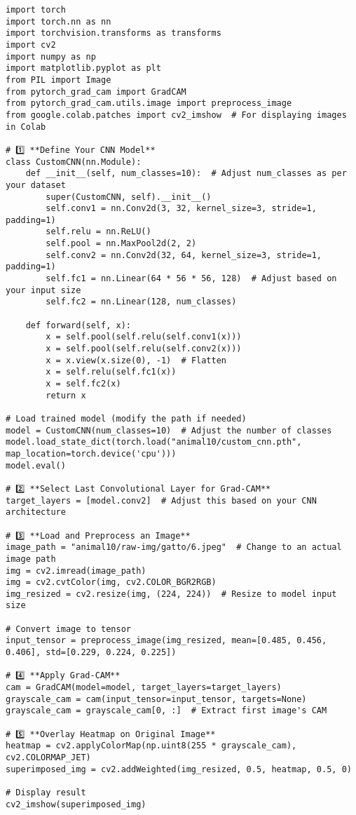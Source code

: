 \begin{verbatim}
import torch
import torch.nn as nn
import torchvision.transforms as transforms
import cv2
import numpy as np
import matplotlib.pyplot as plt
from PIL import Image
from pytorch_grad_cam import GradCAM
from pytorch_grad_cam.utils.image import preprocess_image
from google.colab.patches import cv2_imshow  # For displaying images in Colab

# 1️⃣ **Define Your CNN Model**
class CustomCNN(nn.Module):
    def __init__(self, num_classes=10):  # Adjust num_classes as per your dataset
        super(CustomCNN, self).__init__()
        self.conv1 = nn.Conv2d(3, 32, kernel_size=3, stride=1, padding=1)
        self.relu = nn.ReLU()
        self.pool = nn.MaxPool2d(2, 2)
        self.conv2 = nn.Conv2d(32, 64, kernel_size=3, stride=1, padding=1)
        self.fc1 = nn.Linear(64 * 56 * 56, 128)  # Adjust based on your input size
        self.fc2 = nn.Linear(128, num_classes)

    def forward(self, x):
        x = self.pool(self.relu(self.conv1(x)))
        x = self.pool(self.relu(self.conv2(x)))
        x = x.view(x.size(0), -1)  # Flatten
        x = self.relu(self.fc1(x))
        x = self.fc2(x)
        return x

# Load trained model (modify the path if needed)
model = CustomCNN(num_classes=10)  # Adjust the number of classes
model.load_state_dict(torch.load("animal10/custom_cnn.pth", map_location=torch.device('cpu')))
model.eval()

# 2️⃣ **Select Last Convolutional Layer for Grad-CAM**
target_layers = [model.conv2]  # Adjust this based on your CNN architecture

# 3️⃣ **Load and Preprocess an Image**
image_path = "animal10/raw-img/gatto/6.jpeg"  # Change to an actual image path
img = cv2.imread(image_path)
img = cv2.cvtColor(img, cv2.COLOR_BGR2RGB)
img_resized = cv2.resize(img, (224, 224))  # Resize to model input size

# Convert image to tensor
input_tensor = preprocess_image(img_resized, mean=[0.485, 0.456, 0.406], std=[0.229, 0.224, 0.225])

# 4️⃣ **Apply Grad-CAM**
cam = GradCAM(model=model, target_layers=target_layers)
grayscale_cam = cam(input_tensor=input_tensor, targets=None)
grayscale_cam = grayscale_cam[0, :]  # Extract first image's CAM

# 5️⃣ **Overlay Heatmap on Original Image**
heatmap = cv2.applyColorMap(np.uint8(255 * grayscale_cam), cv2.COLORMAP_JET)
superimposed_img = cv2.addWeighted(img_resized, 0.5, heatmap, 0.5, 0)

# Display result
cv2_imshow(superimposed_img)

\end{verbatim}

